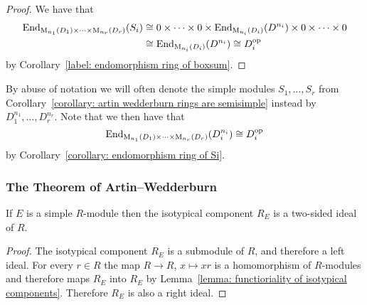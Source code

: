 \begin{proof}
  We have that
  \begin{align*}
            \operatorname{End}_{\operatorname{M}_{n_1}(D_1) \times \dotsb \times \operatorname{M}_{n_r}(D_r)}(S_i)
    &\cong  0 \times \dotsb \times 0 \times \operatorname{End}_{\operatorname{M}_{n_i}(D_i)}(D^{n_i}) \times 0 \times \dotsb \times 0 \\
    &\cong  \operatorname{End}_{\operatorname{M}_{n_i}(D_i)}(D^{n_i})
     \cong  D_i^{\mathrm{op}}
  \end{align*}
  by Corollary~\ref{label: endomorphism ring of boxsum}.
\end{proof}



\begin{notation}
  \label{notation: simple modules over products of matrix rings}
  By abuse of notation we will often denote the simple modules $S_1, \dotsc, S_r$ from Corollary~\ref{corollary: artin wedderburn rings are semisimple} instead by $D_1^{n_1}, \dotsc, D_r^{n_r}$.
  Note that we then have that
  \[
          \operatorname{End}_{\operatorname{M}_{n_1}(D_1) \times \dotsb \times \operatorname{M}_{n_r}(D_r)}(D_i^{n_i})
    \cong D_i^{\mathrm{op}}
  \]
  by Corollary~\ref{corollary: endomorphism ring of Si}.
\end{notation}







\subsubsection{The Theorem of Artin--Wedderburn}


\begin{lemma}
  \label{lemma: isotypical components are two sided ideals}
  If $E$ is a simple $R$-module then the isotypical component $R_E$ is a two-sided ideal of $R$.
\end{lemma}


\begin{proof}
  The isotypical component $R_E$ is a submodule of $R$, and therefore a left ideal.
  For every $r \in R$ the map $R \to R$, $x \mapsto xr$ is a homomorphism of $R$-modules and therefore maps $R_E$ into $R_E$ by Lemma~\ref{lemma: functioriality of isotypical components}.
  Therefore $R_E$ is also a right ideal.
\end{proof}


